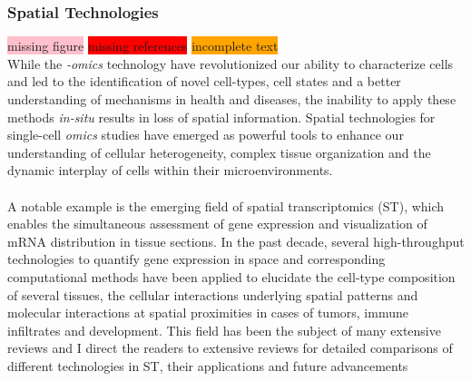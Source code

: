 \subsubsection{Spatial Technologies}
\colorbox{pink}{missing figure} \colorbox{red}{missing references} \colorbox{orange}{incomplete text}\\
While the \textit{-omics} technology have revolutionized our ability to characterize cells and led to the identification of novel cell-types, cell states and a better understanding of mechanisms in health and diseases, the inability to apply these methods \textit{in-situ} results in loss of spatial information. Spatial technologies for single-cell \textit{omics} studies have emerged as powerful tools to enhance our understanding of cellular heterogeneity, complex tissue organization and the dynamic interplay of cells within their microenvironments.\\\\
	A notable example is the emerging field of spatial transcriptomics (ST), which enables the simultaneous assessment of gene expression and visualization of mRNA distribution in tissue sections. In the past decade, several high-throughput technologies to quantify gene expression in space and corresponding computational methods have been applied to elucidate the cell-type composition of several tissues, the cellular interactions underlying spatial patterns and molecular interactions at spatial proximities in cases of tumors, immune infiltrates and development. This field has been the subject of many extensive reviews and I direct the readers to extensive reviews for detailed comparisons of different technologies in ST, their applications and future advancements \textbf{\cite{rao_exploring_2021,moses_museum_2022,duan_spatially_2022,tian_expanding_2023,cheng_spatially_2023}}


\clearpage
